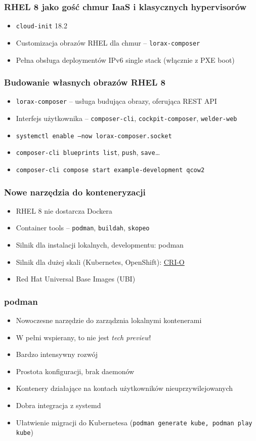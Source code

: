 \documentclass[dvipsnames,table]{beamer}
\begin{document}
\begin{frame}
	\frametitle{RHEL 8 jako gość chmur IaaS i klasycznych hypervisorów}
\begin{itemize}
	\item {\tt cloud-init} 18.2
	\item Customizacja obrazów RHEL dla chmur -- {\tt lorax-composer}
	\item Pełna obsługa deploymentów IPv6 single stack (włącznie z PXE boot)
\end{itemize}
\end{frame}

\begin{frame}
	\frametitle{Budowanie własnych obrazów RHEL 8}
	\begin{itemize}
		\item {\tt lorax-composer} -- usługa budująca obrazy, oferująca REST API
		\item Interfejs użytkownika -- {\tt composer-cli}, {\tt cockpit-composer}, {\tt welder-web}
		\item {\tt systemctl enable --now lorax-composer.socket}
		\item {\tt composer-cli blueprints list}, {\tt push}, {\tt save}\ldots
		\item {\tt composer-cli compose start example-development qcow2}	\end{itemize}

\end{frame}

\begin{frame}
	\frametitle{Nowe narzędzia do konteneryzacji}
\begin{itemize}
	\item RHEL 8 nie dostarcza Dockera
	\item Container tools -- {\tt podman}, {\tt buildah}, {\tt skopeo}
	\item Silnik dla instalacji lokalnych, developmentu: podman
	\item Silnik dla dużej skali (Kubernetes, OpenShift): \href{https://cri-o.io/}{CRI-O}
	\item Red Hat Universal Base Images (UBI)
\end{itemize}
\end{frame}

\begin{frame}
	\frametitle{podman}
	\begin{itemize}
		\item Nowoczesne narzędzie do zarządznia lokalnymi kontenerami
		\item W pełni wspierany, to nie jest {\em tech preview}!
		\item Bardzo intensywny rozwój
		\item Prostota konfiguracji, brak daemonów
		\item Kontenery działające na kontach użytkowników nieuprzywilejowanych
		\item Dobra integracja z systemd
		\item Ułatwienie migracji do Kubernetesa ({\tt podman generate kube, podman play kube})
	\end{itemize}
\end{frame}
\end{document}
